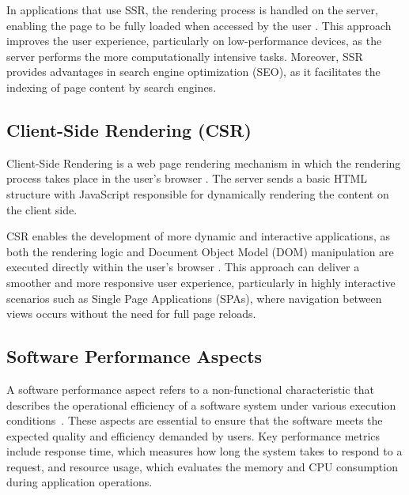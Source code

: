 \documentclass{sbc2019}%
\begin{document}
In applications that use SSR, the rendering process is handled on the server, enabling the page to be fully loaded when accessed by the user \citet{clientServerSide:2020}. This approach improves the user experience, particularly on low-performance devices, as the server performs the more computationally intensive tasks. Moreover, SSR provides advantages in search engine optimization (SEO), as it facilitates the indexing of page content by search engines.

\subsection{Client-Side Rendering (CSR)}
\label{sec:csr}

Client-Side Rendering is a web page rendering mechanism in which the rendering process takes place in the user's browser \cite{clientServerSide:2020}. The server sends a basic HTML structure with JavaScript responsible for dynamically rendering the content on the client side.


CSR enables the development of more dynamic and interactive applications, as both the rendering logic and Document Object Model (DOM) manipulation are executed directly within the user's browser \cite{clientServerSide:2020}. This approach can deliver a smoother and more responsive user experience, particularly in highly interactive scenarios such as Single Page Applications (SPAs), where navigation between views occurs without the need for full page reloads.

\subsection{Software Performance Aspects}
\label{sec:performance_aspects}

A software performance aspect refers to a non-functional characteristic that describes the operational efficiency of a software system under various execution conditions~\cite{performanceAspects}. These aspects are essential to ensure that the software meets the expected quality and efficiency demanded by users. Key performance metrics include response time, which measures how long the system takes to respond to a request, and resource usage, which evaluates the memory and CPU consumption during application operations.
\end{document}
